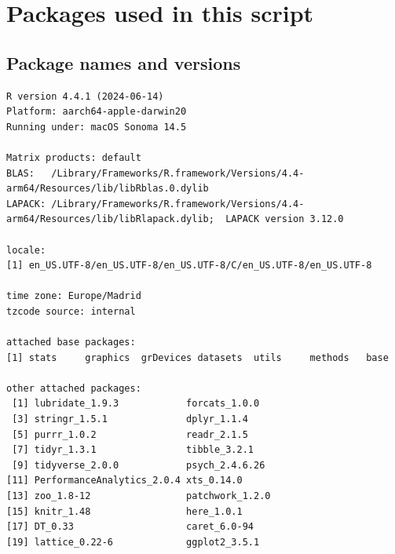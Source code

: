 \documentclass[
  letterpaper,
  DIV=11,
  numbers=noendperiod]{scrreprt}
\begin{document}
\section{Packages used in this
script}\label{packages-used-in-this-script-1}

\subsection{Package names and
versions}\label{package-names-and-versions-1}

\begin{verbatim}
R version 4.4.1 (2024-06-14)
Platform: aarch64-apple-darwin20
Running under: macOS Sonoma 14.5

Matrix products: default
BLAS:   /Library/Frameworks/R.framework/Versions/4.4-arm64/Resources/lib/libRblas.0.dylib 
LAPACK: /Library/Frameworks/R.framework/Versions/4.4-arm64/Resources/lib/libRlapack.dylib;  LAPACK version 3.12.0

locale:
[1] en_US.UTF-8/en_US.UTF-8/en_US.UTF-8/C/en_US.UTF-8/en_US.UTF-8

time zone: Europe/Madrid
tzcode source: internal

attached base packages:
[1] stats     graphics  grDevices datasets  utils     methods   base     

other attached packages:
 [1] lubridate_1.9.3            forcats_1.0.0             
 [3] stringr_1.5.1              dplyr_1.1.4               
 [5] purrr_1.0.2                readr_2.1.5               
 [7] tidyr_1.3.1                tibble_3.2.1              
 [9] tidyverse_2.0.0            psych_2.4.6.26            
[11] PerformanceAnalytics_2.0.4 xts_0.14.0                
[13] zoo_1.8-12                 patchwork_1.2.0           
[15] knitr_1.48                 here_1.0.1                
[17] DT_0.33                    caret_6.0-94              
[19] lattice_0.22-6             ggplot2_3.5.1             


\end{verbatim}
\end{document}
